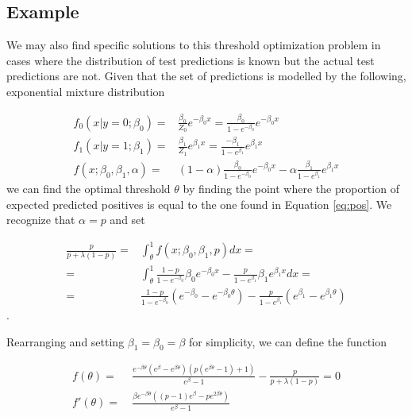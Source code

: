 \documentclass{article}
\begin{document}

\subsection{Example}

We may also find specific solutions to this threshold optimization problem in cases where the distribution of test predictions is known but the actual test predictions are not.
Given that the set of predictions is modelled by the following, exponential mixture distribution

\begin{align*}
    f_0(x\vert y=0;\beta_0) =& \frac{\beta_0}{Z_0}e^{-\beta_0 x} = \frac{\beta_0}{1-e^{-\beta_0}}e^{-\beta_0 x} \\
    f_1(x\vert y=1;\beta_1) =& \frac{\beta_1}{Z_1}e^{\beta_1 x} = \frac{-\beta_1}{1-e^{\beta_1}}e^{\beta_1 x}\\
    f (x;\beta_0,\beta_1,\alpha) =& (1-\alpha)\frac{\beta_0}{1-e^{-\beta_0}}e^{-\beta_0 x} - \alpha\frac{\beta_1}{1-e^{\beta_1}}e^{\beta_1 x} %
\end{align*}
we can find the optimal threshold $\theta$ by finding the point where the proportion of expected predicted positives is equal to the one found in Equation \ref{eq:pos}. We recognize that $\alpha = p$ and set

\begin{align}
    \frac{p}{p+\lambda(1-p)} = & \int_{\theta}^1 f(x;\beta_0, \beta_1, p) dx = \\
    = & \int_{\theta}^1 \frac{1-p}{1-e^{-\beta_0}}\beta_0e^{-\beta_0x} - \frac{p}{1-e^{\beta_1}}\beta_1e^{\beta_1x} dx = \\
    = & \frac{1-p}{1-e^{-\beta_0}}(e^{-\beta_0}-e^{-\beta_0 \theta}) - \frac{p}{1-e^{\beta_1}}(e^{\beta_1}-e^{\beta_1 \theta})
\end{align}.

Rearranging and setting $\beta_1 = \beta_0 = \beta$ for simplicity, we can define the function

\begin{align}
    f(\theta) =& \ \frac{e^{-\beta \theta} (e^\beta-e^{\beta \theta}) (p(e^{\beta \theta}-1) + 1)}{e^{\beta}-1} - \frac{p}{p+\lambda(1-p)} = 0 \\
    f'(\theta) =& \ \frac{\beta e^{-\beta \theta} ((p-1) e^\beta - p e^{2\beta \theta})}{e^{\beta}-1} \\
\end{align}
\end{document}
